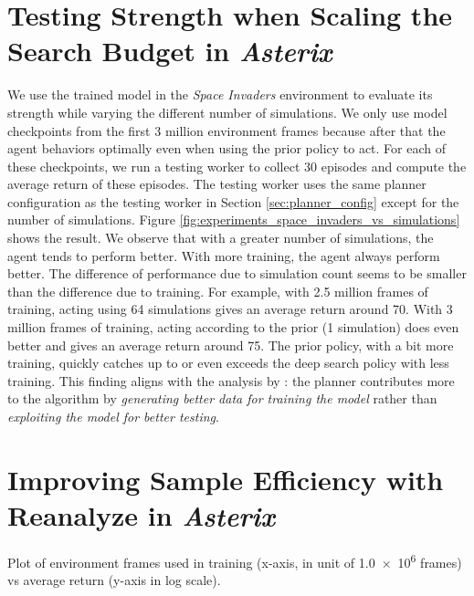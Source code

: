\section{Testing Strength when Scaling the Search Budget in \textit{Asterix}}
We use the trained \moozi model in the \textit{Space Invaders} environment to evaluate its strength while varying the different number of simulations.
We only use model checkpoints from the first 3 million environment frames because after that the agent behaviors optimally even when using the prior policy to act.
For each of these checkpoints, we run a testing worker to collect 30 episodes and compute the average return of these episodes.
The testing worker uses the same planner configuration as the testing worker in Section \ref{sec:planner_config} except for the number of simulations.
Figure \ref{fig:experiments_space_invaders_vs_simulations} shows the result.
We observe that with a greater number of simulations, the agent tends to perform better.
With more training, the agent always perform better.
The difference of performance due to simulation count seems to be smaller than the difference due to training.
For example, with 2.5 million frames of training, acting using 64 simulations gives an average return around 70.
With 3 million frames of training, acting according to the prior (1 simulation) does even better and gives an average return around 75.
The prior policy, with a bit more training, quickly catches up to or even exceeds the deep search policy with less training.
This finding aligns with the analysis by \citeauthor{ROLEPLANNINGMODELBASED_Hamrick.Friesen.ea_2021} \cite{ROLEPLANNINGMODELBASED_Hamrick.Friesen.ea_2021}:
the planner contributes more to the algorithm by \textit{generating better data for training the model} rather than \textit{exploiting the model for better testing}.


\section{Improving Sample Efficiency with Reanalyze in \textit{Asterix}} \label{sec:exp:re}

{
    Plot of environment frames used in training (x-axis, in unit of \num{1.0e6} frames) vs average return (y-axis in log scale).
}


